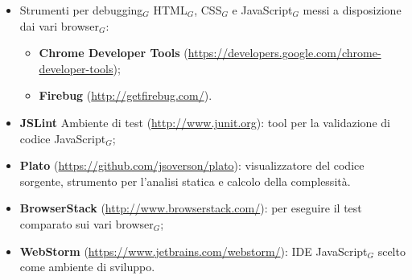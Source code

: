 \begin{itemize}
	\item Strumenti per debugging$_G$ HTML$_G$, CSS$_G$ e JavaScript$_G$ messi a disposizione dai vari browser$_G$:
	    \begin{itemize}
	    	\item \textbf{Chrome Developer Tools} (\href{https://developers.google.com/chrome-developer-tools}
	    	{https://developers.google.com/chrome-developer-tools});
	    	\item \textbf{Firebug}
	    	(\href{http://getfirebug.com/}{http://getfirebug.com/}).
	    \end{itemize}
	\item \textbf{JSLint} Ambiente di test (\href{http://www.junit.org}{http://www.junit.org}): tool per la validazione di codice JavaScript$_G$;
	\item \textbf{Plato} (\href{https://github.com/jsoverson/plato}{https://github.com/jsoverson/plato}): visualizzatore del codice sorgente, strumento per l'analisi statica e calcolo della complessità.
	\item \textbf{BrowserStack} (\href{http://www.browserstack.com/}{http://www.browserstack.com/}):  per eseguire il test comparato sui vari browser$_G$;
	\item \textbf{WebStorm} (\href{https://www.jetbrains.com/webstorm/}{https://www.jetbrains.com/webstorm/}): IDE JavaScript$_G$ scelto come ambiente di sviluppo.
\end{itemize}

